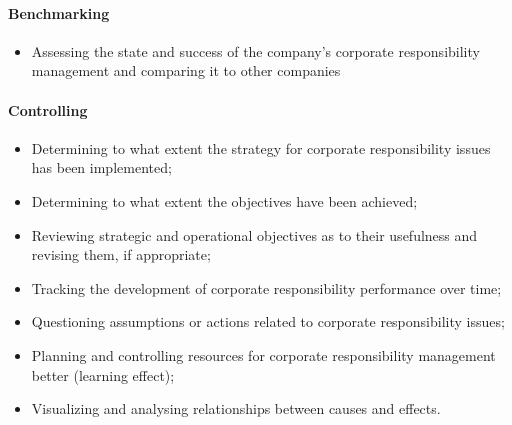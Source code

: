 \documentclass[11pt]{article}
\theoremstyle{definition}
\begin{document}
\paragraph{Benchmarking}
\begin{itemize}
	\item Assessing the state and success of the company's corporate responsibility management and comparing it to other companies
\end{itemize}

\paragraph{Controlling}
\begin{itemize}
	\item Determining to what extent the strategy for corporate responsibility issues has been implemented;
	\item Determining to what extent the objectives have been achieved;
	\item Reviewing strategic and operational objectives as to their usefulness and revising them, if appropriate;
	\item Tracking the development of corporate responsibility performance over time;
	\item Questioning assumptions or actions related to corporate responsibility issues;
	\item Planning and controlling resources for corporate responsibility management better (learning effect);
	\item Visualizing and analysing relationships between causes and effects.
\end{itemize}
\end{document}
